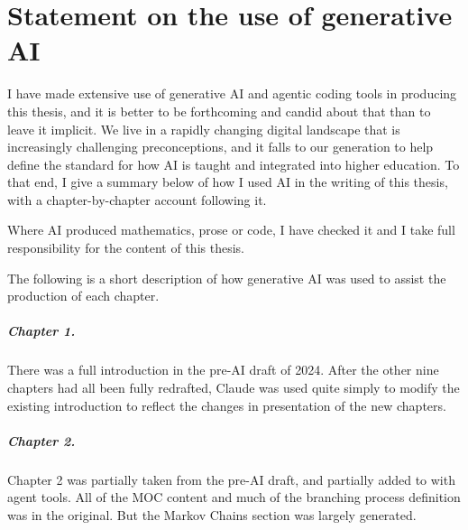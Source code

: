 %

\chapter*{Statement on the use of generative AI}
\label{sup:ai-use}

I have made extensive use of generative AI and agentic coding tools in producing this thesis, and it is better to be forthcoming and candid about that than to leave it implicit. We live in a rapidly changing digital landscape that is increasingly challenging preconceptions, and it falls to our generation to help define the standard for how AI is taught and integrated into higher education. To that end, I give a summary below of how I used AI in the writing of this thesis, with a chapter-by-chapter account following it.

Where AI produced mathematics, prose or code, I have checked it and I take full responsibility for the content of this thesis.

\label{sup:ai-account}

The following is a short description of how generative AI was used to assist the production of each chapter.

\paragraph{Chapter 1.}
There was a full introduction in the pre-AI draft of 2024. After the other nine chapters had all been fully redrafted, Claude was used quite simply to modify the existing introduction to reflect the changes in presentation of the new chapters.

\paragraph{Chapter 2.}
Chapter 2 was partially taken from the pre-AI draft, and partially added to with agent tools. All of the MOC content and much of the branching process definition was in the original. But the Markov Chains section was largely generated.

